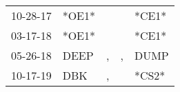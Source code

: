\begin{supertabular}{lllll}
 10-28-17 &  *OE1* &    &    &  *CE1* \\
 03-17-18 &  *OE1* &    &    &  *CE1* \\
 05-26-18 &   DEEP &  , &  , &   DUMP \\
 10-17-19 &    DBK &  , &    &  *CS2* \\
\end{supertabular}
